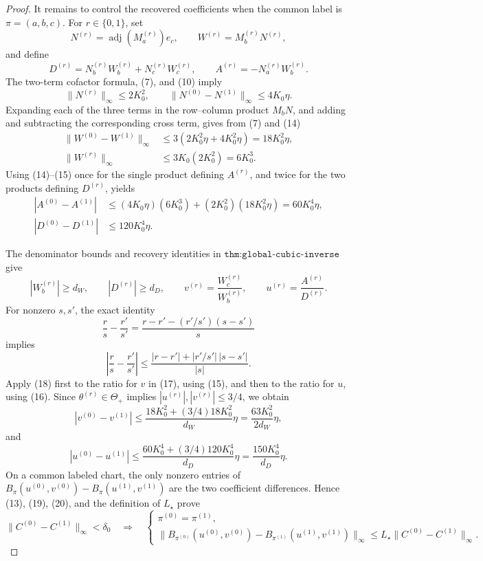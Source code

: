 \documentclass{article}
\begin{document}
\begin{proof}
It remains to control the recovered coefficients when the common label is \(\pi=(a,b,c)\).  For \(r\in\{0,1\}\), set
\[
 N^{(r)}=\operatorname{adj}(M_a^{(r)})e_c,
 \qquad
 W^{(r)}=M_b^{(r)}N^{(r)},
\]
and define
\[
 D^{(r)}=N_b^{(r)}W_b^{(r)}+N_c^{(r)}W_c^{(r)},
 \qquad
 A^{(r)}=-N_a^{(r)}W_b^{(r)}.
\]
The two-term cofactor formula, (7), and (10) imply
\[
 \|N^{(r)}\|_\infty\leq2K_0^2,
 \qquad
 \|N^{(0)}-N^{(1)}\|_\infty\leq4K_0\eta.                       \tag{14}
\]
Expanding each of the three terms in the row--column product \(M_bN\), and adding and subtracting the corresponding cross term, gives from (7) and (14)
\[
 \begin{aligned}
 \|W^{(0)}-W^{(1)}\|_\infty
 &\leq3\left(2K_0^2\eta+4K_0^2\eta\right)
 =18K_0^2\eta,\\
 \|W^{(r)}\|_\infty
 &\leq3K_0(2K_0^2)=6K_0^3.
 \end{aligned}                                                     \tag{15}
\]
Using (14)--(15) once for the single product defining \(A^{(r)}\), and twice for the two products defining \(D^{(r)}\), yields
\[
 \begin{aligned}
 |A^{(0)}-A^{(1)}|
 &\leq(4K_0\eta)(6K_0^3)+(2K_0^2)(18K_0^2\eta)
 =60K_0^4\eta,\\
 |D^{(0)}-D^{(1)}|
 &\leq120K_0^4\eta.
 \end{aligned}                                                     \tag{16}
\]

The denominator bounds and recovery identities in \(\texttt{thm:global-cubic-inverse}\) give
\[
 |W_b^{(r)}|\geq d_W,
 \qquad |D^{(r)}|\geq d_D,
 \qquad
 v^{(r)}=\frac{W_c^{(r)}}{W_b^{(r)}},
 \qquad
 u^{(r)}=\frac{A^{(r)}}{D^{(r)}}.                                  \tag{17}
\]
For nonzero \(s,s'\), the exact identity
\[
 \frac{r}{s}-\frac{r'}{s'}
 =\frac{r-r'-(r'/s')(s-s')}{s}
\]
implies
\[
 \left|\frac{r}{s}-\frac{r'}{s'}\right|
 \leq\frac{|r-r'|+|r'/s'|\,|s-s'|}{|s|}.                         \tag{18}
\]
Apply (18) first to the ratio for \(v\) in (17), using (15), and then to the ratio for \(u\), using (16).  Since \(\theta^{(r)}\in\Theta_+\) implies \(|u^{(r)}|,|v^{(r)}|\leq3/4\), we obtain
\[
 |v^{(0)}-v^{(1)}|
 \leq
 \frac{18K_0^2+(3/4)18K_0^2}{d_W}\eta
 =\frac{63K_0^2}{2d_W}\eta,                                      \tag{19}
\]
and
\[
 |u^{(0)}-u^{(1)}|
 \leq
 \frac{60K_0^4+(3/4)120K_0^4}{d_D}\eta
 =\frac{150K_0^4}{d_D}\eta.                                      \tag{20}
\]
On a common labeled chart, the only nonzero entries of
\(B_\pi(u^{(0)},v^{(0)})-B_\pi(u^{(1)},v^{(1)})\) are the two coefficient differences.  Hence (13), (19), (20), and the definition of \(L_\star\) prove
\[
 \|C^{(0)}-C^{(1)}\|_\infty<\delta_0
 \quad\Longrightarrow\quad
 \begin{cases}
 \pi^{(0)}=\pi^{(1)},\\[2pt]
 \|B_{\pi^{(0)}}(u^{(0)},v^{(0)})
      -B_{\pi^{(1)}}(u^{(1)},v^{(1)})\|_\infty
 \leq L_\star\|C^{(0)}-C^{(1)}\|_\infty.
 \end{cases}                                                       \tag{21}
\]


\end{proof}
\end{document}
